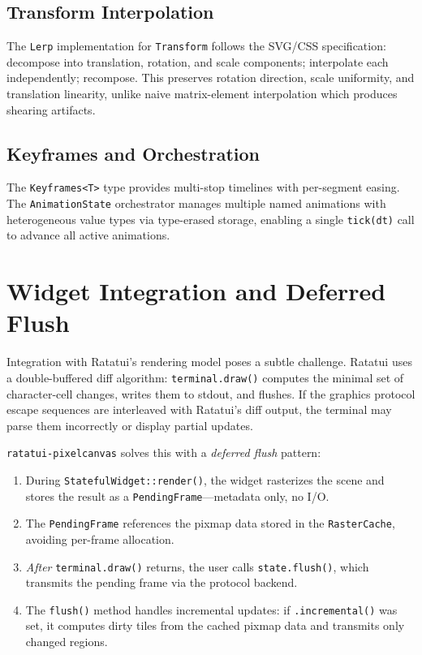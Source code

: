 \documentclass[11pt, a4paper, twocolumn]{article}
\begin{document}
\subsection{Transform Interpolation}

The \texttt{Lerp} implementation for \texttt{Transform} follows the SVG/CSS specification: decompose into translation, rotation, and scale components; interpolate each independently; recompose.
This preserves rotation direction, scale uniformity, and translation linearity, unlike naive matrix-element interpolation which produces shearing artifacts.

\subsection{Keyframes and Orchestration}

The \texttt{Keyframes<T>} type provides multi-stop timelines with per-segment easing.
The \texttt{AnimationState} orchestrator manages multiple named animations with heterogeneous value types via type-erased storage, enabling a single \texttt{tick(dt)} call to advance all active animations.

\section{Widget Integration and Deferred Flush}
\label{sec:widget}

Integration with Ratatui's rendering model poses a subtle challenge.
Ratatui uses a double-buffered diff algorithm: \texttt{terminal.draw()} computes the minimal set of character-cell changes, writes them to stdout, and flushes.
If the graphics protocol escape sequences are interleaved with Ratatui's diff output, the terminal may parse them incorrectly or display partial updates.

\texttt{ratatui-pixelcanvas} solves this with a \emph{deferred flush} pattern:

\begin{enumerate}[leftmargin=1.5em, itemsep=0.1em]
    \item During \texttt{StatefulWidget::render()}, the widget rasterizes the scene and stores the result as a \texttt{PendingFrame}---metadata only, no I/O.
    \item The \texttt{PendingFrame} references the pixmap data stored in the \texttt{RasterCache}, avoiding per-frame allocation.
    \item \emph{After} \texttt{terminal.draw()} returns, the user calls \texttt{state.flush()}, which transmits the pending frame via the protocol backend.
    \item The \texttt{flush()} method handles incremental updates: if \texttt{.incremental()} was set, it computes dirty tiles from the cached pixmap data and transmits only changed regions.
\end{enumerate}
\end{document}
